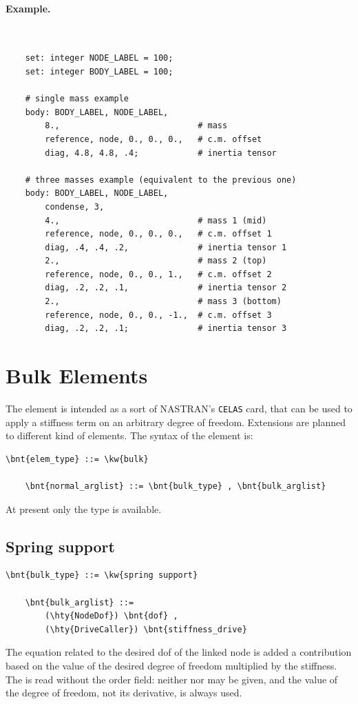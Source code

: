 \paragraph{Example.} \
\begin{verbatim}
    set: integer NODE_LABEL = 100;
    set: integer BODY_LABEL = 100;

    # single mass example
    body: BODY_LABEL, NODE_LABEL,
        8.,                            # mass
        reference, node, 0., 0., 0.,   # c.m. offset
        diag, 4.8, 4.8, .4;            # inertia tensor

    # three masses example (equivalent to the previous one)
    body: BODY_LABEL, NODE_LABEL,
        condense, 3,
        4.,                            # mass 1 (mid)
        reference, node, 0., 0., 0.,   # c.m. offset 1
        diag, .4, .4, .2,              # inertia tensor 1
        2.,                            # mass 2 (top)
        reference, node, 0., 0., 1.,   # c.m. offset 2
        diag, .2, .2, .1,              # inertia tensor 2
        2.,                            # mass 3 (bottom)
        reference, node, 0., 0., -1.,  # c.m. offset 3
        diag, .2, .2, .1;              # inertia tensor 3
\end{verbatim}



\section{Bulk Elements}
The  element is intended as a sort of NASTRAN's \texttt{CELAS} card,
that can be used to apply a stiffness term on an arbitrary degree of freedom.
Extensions are planned to different kind of elements.
The syntax of the  element is:
\begin{Verbatim}[commandchars=\\\{\}]
    \bnt{elem_type} ::= \kw{bulk}

    \bnt{normal_arglist} ::= \bnt{bulk_type} , \bnt{bulk_arglist}
\end{Verbatim}
At present only the  type is available.

\subsection{Spring support}
\begin{Verbatim}[commandchars=\\\{\}]
    \bnt{bulk_type} ::= \kw{spring support}

    \bnt{bulk_arglist} ::=
        (\hty{NodeDof}) \bnt{dof} ,
        (\hty{DriveCaller}) \bnt{stiffness_drive}
\end{Verbatim}
The equation related to the desired dof of the linked node is added a
contribution based on the value of the desired degree of freedom
multiplied by the stiffness.
The  is read without the order field: neither  nor
\kw{differential} may be given, and the value of the degree of freedom,
not its derivative, is always used.

